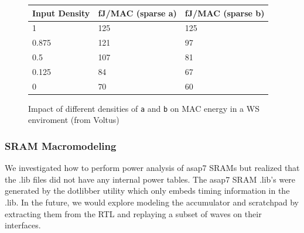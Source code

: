 \documentclass[sigconf]{acmart}
\begin{document}
\begin{figure}
\begin{tabular}{l l l}
  \toprule
  \textbf{Input Density} & \textbf{fJ/MAC (sparse a)} & \textbf{fJ/MAC (sparse b)} \\ \midrule
  1 & 125 & 125 \\
  0.875 & 121 & 97 \\
  0.5 & 107 & 81 \\
  0.125 & 84 & 67 \\
  0 & 70 & 60 \\
  \bottomrule
\end{tabular}
\caption{Impact of different densities of \texttt{a} and \texttt{b} on MAC energy in a WS enviroment (from Voltus)}
\label{fig:density_mac}
\end{figure}

\subsubsection{SRAM Macromodeling}
We investigated how to perform power analysis of asap7 SRAMs but realized that the .lib files did not have any internal power tables.
The asap7 SRAM .lib's were generated by the dotlibber utility which only embeds timing information in the .lib.
In the future, we would explore modeling the accumulator and scratchpad by extracting them from the RTL and replaying a subset of waves on their interfaces.
\end{document}
